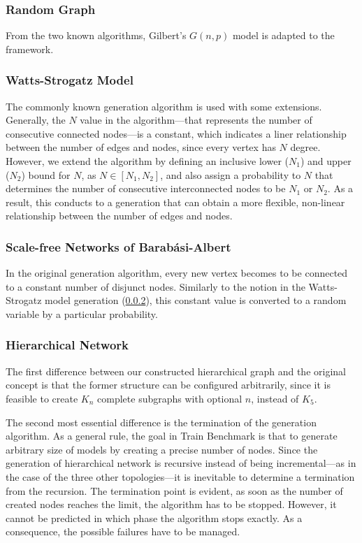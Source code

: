 \subsubsection{Random Graph}
From the two known algorithms, Gilbert's $G(n,p)$ model is adapted to the framework.

\subsubsection{Watts-Strogatz Model}\label{sec:watts_generation}

The commonly known generation algorithm is used with some extensions. Generally, the $N$ value in the algorithm---that represents the number of consecutive connected nodes---is a constant, which indicates a liner relationship between the number of edges and nodes, since every vertex has $N$ degree. However, we extend the algorithm by defining an inclusive lower ($N_1$) and upper ($N_2$) bound for $N$, as $N\in[N_1, N_2]$, and also assign a probability to $N$ that determines the number of consecutive interconnected nodes to be $N_1$ or $N_2$. As a result, this conducts to a generation that can obtain a more flexible, non-linear relationship between the number of edges and nodes.

\subsubsection{Scale-free Networks of Barabási-Albert}

In the original generation algorithm, every new vertex becomes to be connected to a constant number of disjunct nodes. Similarly to the notion in the Watts-Strogatz model generation (\ref{sec:watts_generation}), this constant value is converted to a random variable by a particular probability.

\subsubsection{Hierarchical Network}\label{sec:hierarcical_contribution}

The first difference between our constructed hierarchical graph and the original concept is that the former structure can be configured arbitrarily, since it is feasible to create $K_n$ complete subgraphs with optional $n$, instead of $K_5$. %

The second most essential difference is the termination of the generation algorithm. As a general rule, the goal in Train Benchmark is that to generate arbitrary size of models by creating a precise number of nodes. Since the generation of hierarchical network is recursive instead of being incremental---as in the case of the three other topologies---it is inevitable to determine a termination from the recursion. The termination point is evident, as soon as the number of created nodes reaches the limit, the algorithm has to be stopped. However, it cannot be predicted in which phase the algorithm stops exactly. As a consequence, the possible failures have to be managed.

